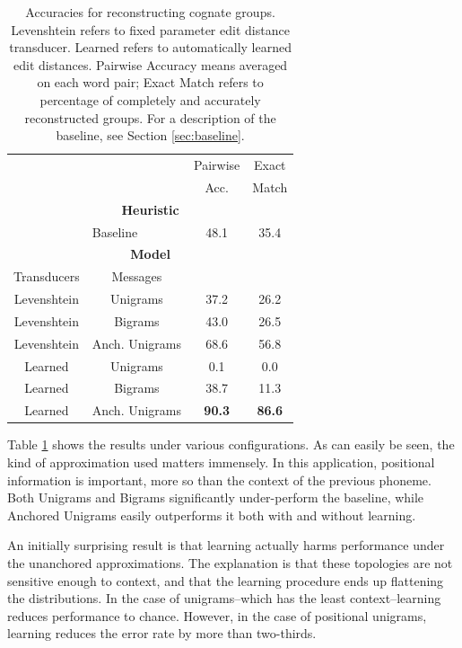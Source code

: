 \documentclass[11pt,a4paper]{article}
\begin{document}
\begin{table}
  \small
  { 
  \begin{tabular}{|c|c|c|c|}
    \cline{3-4} 
    \multicolumn{2}{c|}{} & Pairwise & Exact \\
    \multicolumn{2}{c|}{} & Acc. & Match \\
    \hline 
    \multicolumn{4}{|c|}{\textbf{Heuristic}} \\
    \hline
    \multicolumn{1}{|c}{} & \multicolumn{1}{l|}{Baseline} & 48.1 & 35.4  \\
    \hline
    \hline
    \multicolumn{4}{|c|}{\textbf{Model}} \\
    \hline
    Transducers & Messages & \multicolumn{2}{c}{} \\
    \hline
    Levenshtein&Unigrams & 37.2 & 26.2 \\
    Levenshtein&Bigrams & 43.0 & 26.5 \\
    Levenshtein&Anch. Unigrams & 68.6 & 56.8\\
    Learned&Unigrams & 0.1 & 0.0 \\
    Learned&Bigrams & 38.7 & 11.3 \\
    Learned&Anch. Unigrams & \textbf{90.3}  & \textbf{86.6} \\
    \hline
  \end{tabular}
  \caption{Accuracies for reconstructing cognate groups. Levenshtein
  refers to fixed parameter edit distance transducer. Learned refers
  to automatically learned edit distances. Pairwise Accuracy means averaged
  on each word pair; Exact Match refers to percentage of completely and accurately
  reconstructed groups. For a description of the baseline, see Section \ref{sec:baseline}. }
  \label{tbl:exp1}
 }
\end{table}

Table \ref{tbl:exp1} shows the results under various configurations.
As can easily be seen, the kind of approximation used matters
immensely. In this application, positional information is important,
more so than the context of the previous phoneme. Both Unigrams and
Bigrams significantly under-perform the baseline, while Anchored
Unigrams easily outperforms it both with and without learning.

An initially surprising result is that learning actually harms
performance under the unanchored approximations. The explanation
is that these topologies are not sensitive enough to context, and
that the learning procedure ends up flattening the distributions.
In the case of unigrams--which has the least context--learning
reduces performance to chance. However, in the case of positional
unigrams, learning reduces the error rate by more than two-thirds.
\end{document}
